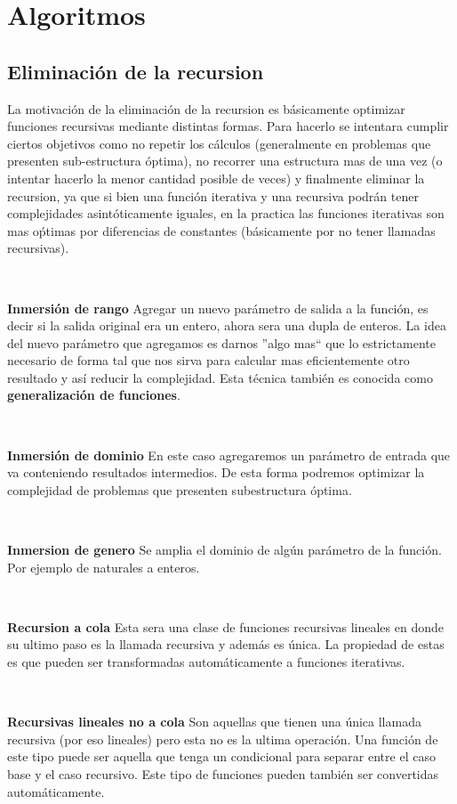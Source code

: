\chapter{Algoritmos}

\section{Eliminaci\'on de la recursion}

La motivaci\'on de la eliminaci\'on de la recursion es b\'asicamente optimizar funciones recursivas mediante distintas formas. Para hacerlo se intentara cumplir ciertos objetivos como no repetir los c\'alculos (generalmente en problemas que presenten sub-estructura \'optima), no recorrer una estructura mas de una vez (o intentar hacerlo la menor cantidad posible de veces) y finalmente eliminar la recursion, ya que si bien una funci\'on iterativa y una recursiva podr\'an tener complejidades asint\'oticamente iguales, en la practica las funciones iterativas son mas o\'ptimas por diferencias de constantes (b\'asicamente por no tener llamadas recursivas).

~

\textbf{Inmersi\'on de rango} Agregar un nuevo par\'ametro de salida a la funci\'on, es decir si la salida original era un entero, ahora sera una dupla de enteros. La idea del nuevo par\'ametro que agregamos es darnos ''algo mas`` que lo estrictamente necesario de forma tal que nos sirva para calcular mas eficientemente otro resultado y as\'i reducir la complejidad. Esta t\'ecnica tambi\'en es conocida como \textbf{generalizaci\'on de funciones}.

~

\textbf{Inmersi\'on de dominio} En este caso agregaremos un par\'ametro de entrada que va conteniendo resultados intermedios. De esta forma podremos optimizar la complejidad de problemas que presenten subestructura \'optima.

~

\textbf{Inmersion de genero} Se amplia el dominio de alg\'un par\'ametro de la funci\'on. Por ejemplo de naturales a enteros.

~

\textbf{Recursion a cola} Esta sera una clase de funciones recursivas lineales en donde su ultimo paso es la llamada recursiva y adem\'as es \'unica. La propiedad de estas es que pueden ser transformadas autom\'aticamente a funciones iterativas.

~

\textbf{Recursivas lineales no a cola} Son aquellas que tienen una \'unica llamada recursiva (por eso lineales) pero esta no es la ultima operaci\'on. Una funci\'on de este tipo puede ser aquella que tenga un condicional para separar entre el caso base y el caso recursivo. Este tipo de funciones pueden tambi\'en ser convertidas autom\'aticamente.

